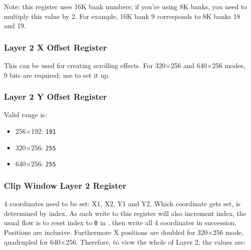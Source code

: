 Note: this register uses 16K bank numbers; if you're using 8K banks, you need to multiply this value by 2. For example, 16K bank 9 corresponds to 8K banks 18 and 19.


\pagebreak
\subsubsection{Layer 2 X Offset Register }

\begin{NextPort}
\end{NextPort}

This can be used for creating scrolling effects. For 320$\times$256 and 640$\times$256 modes, 9 bits are required; use  to set it up.


\subsubsection{Layer 2 Y Offset Register }

\begin{NextPort}
\end{NextPort}

Valid range is:

\begin{itemize}[topsep=1pt,itemsep=1pt]
	\item 256$\times$192: {\tt 191}
	\item 320$\times$256: {\tt 255}
	\item 640$\times$256: {\tt 255}
\end{itemize}


\subsubsection{Clip Window Layer 2 Register }

\begin{NextPort}
\end{NextPort}

4 coordinates need to be set: X1, X2, Y1 and Y2. Which coordinate gets set, is determined by index. As each write to this register will also increment index, the usual flow is to reset index to {\tt 0} in , then write all 4 coordinates in succession. Positions are inclusive. Furthermore X positions are doubled for 320$\times$256 mode, quadrupled for 640$\times$256. Therefore, to view the whole of Layer 2, the values are:

